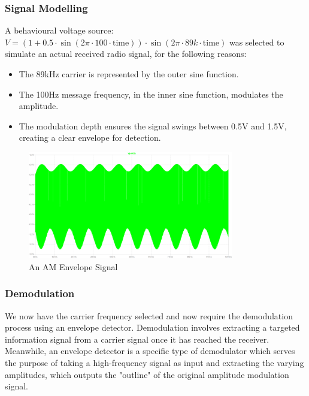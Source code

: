 \subsubsection{Signal Modelling}

A behavioural voltage source: \( V=(1+0.5\cdot\sin(2\pi\cdot100\cdot\text{time})) \cdot \sin(2\pi\cdot89k\cdot\text{time}) \) was selected to simulate an actual received radio signal, for the following reasons:

\begin{itemize}
    \item The 89kHz carrier is represented by the outer sine function.
    \item The 100Hz message frequency, in the inner sine function, modulates the amplitude.
    \item The modulation depth ensures the signal swings between 0.5V and 1.5V, creating a clear envelope for detection.
\end{itemize}

\begin{figure}[H]
    \centering
    \includegraphics[width=0.8\textwidth]{subpages/images/radio_am_envelope_signal.png}
    \caption{An AM Envelope Signal}
    \label{fig:am_envelope}
\end{figure}

\subsubsection{Demodulation}

We now have the carrier frequency selected and now require the demodulation process using an envelope detector. Demodulation involves extracting a targeted information signal from a carrier signal once it has reached the receiver. Meanwhile, an envelope detector is a specific type of demodulator which serves the purpose of taking a high-frequency signal as input and extracting the varying amplitudes, which outputs the "outline" of the original amplitude modulation signal.

